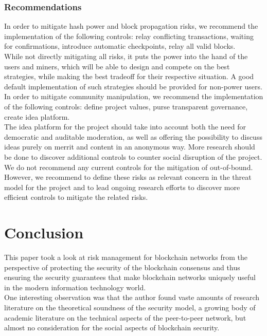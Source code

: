 \documentclass[11pt,a4paper]{article}
\begin{document}
\begin{itemize}
\begin{itemize}
\subsubsection{Recommendations}

In order to mitigate hash power and block propagation risks, we recommend the implementation of the following controls: relay conflicting transactions, waiting for confirmations, introduce automatic checkpoints, relay all valid blocks.\\

While not directly mitigating all risks, it puts the power into the hand of the users and miners, which will be able to design and compete on the best strategies, while making the best tradeoff for their respective situation. A good default implementation of such strategies should be provided for non-power users.\\

In order to mitigate community manipulation, we recommend the implementation of the following controls: define project values, purse transparent governance, create idea platform.\\

The idea platform for the project should take into account both the need for democratic and auditable moderation, as well as offering the possibility to discuss ideas purely on merrit and content in an anonymous way. More research should be done to discover additional controls to counter social disruption of the project.\\

We do not recommend any current controls for the mitigation of out-of-bound. However, we recommend to define these risks as relevant concern in the threat model for the project and to lead ongoing research efforts to discover more efficient controls to mitigate the related risks.\\

\section{Conclusion}

This paper took a look at risk management for blockchain networks from the perspective of protecting the security of the blockchain consensus and thus ensuring the security guarantees that make blockchain networks uniquely useful in the modern information technology world.\\

One interesting observation was that the author found vaste amounts of research literature on the theoretical soundness of the security model, a growing body of academic literature on the technical aspects of the peer-to-peer network, but almost no consideration for the social aspects of blockchain security.\\


\end{itemize}
\end{itemize}
\end{document}
